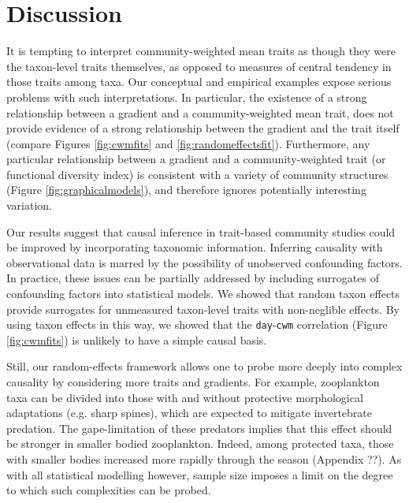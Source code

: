 \documentclass[12pt]{ecology}
\begin{document}
\section{Discussion}

It is tempting to interpret community-weighted mean traits as though they were the taxon-level traits themselves, as opposed to measures of central tendency in those traits among taxa.  Our conceptual and empirical examples expose serious problems with such interpretations.  In particular, the existence of a strong relationship between a gradient and a community-weighted mean trait, does not provide evidence of a strong relationship between the gradient and the trait itself (compare Figures \ref{fig:cwmfits} and \ref{fig:randomeffectsfit}).  Furthermore, any particular relationship between a gradient and a community-weighted trait (or functional diversity index) is consistent with a variety of community structures (Figure \ref{fig:graphicalmodels}), and therefore ignores potentially interesting variation.

Our results suggest that causal inference in trait-based community studies could be improved by incorporating taxonomic information.  Inferring causality with observational data is marred by the possibility of unobserved confounding factors.  In practice, these issues can be partially addressed by including surrogates of confounding factors into statistical models.  We showed that random taxon effects provide surrogates for unmeasured taxon-level traits with non-neglible effects.  By using taxon effects in this way, we showed that the \texttt{day}-\texttt{cwm} correlation (Figure \ref{fig:cwmfits}) is unlikely to have a simple causal basis.

Still, our random-effects framework allows one to probe more deeply into complex causality by considering more traits and gradients.  For example, zooplankton taxa can be divided into those with and without protective morphological adaptations (e.g. sharp spines), which are expected to mitigate invertebrate predation.  The gape-limitation of these predators implies that this effect should be stronger in smaller bodied zooplankton.  Indeed, among protected taxa, those with smaller bodies increased more rapidly through the season (Appendix ??).  As with all statistical modelling however, sample size imposes a limit on the degree to which such complexities can be probed.



\end{document}
